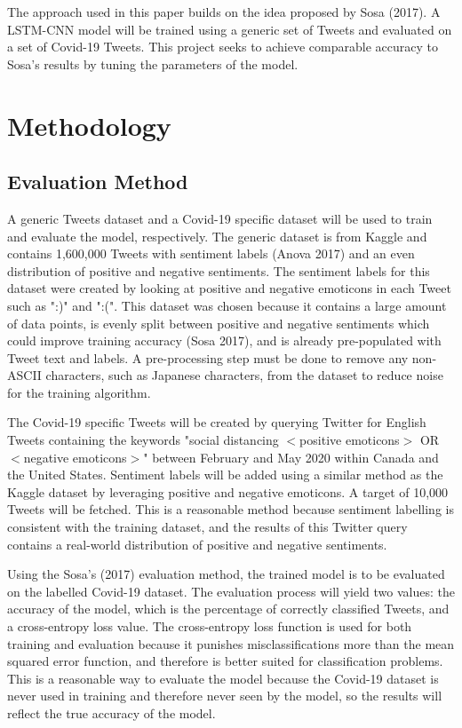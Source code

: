 \documentclass[letterpaper]{article} %
\begin{document}
The approach used in this paper builds on the idea proposed by Sosa (2017). A LSTM-CNN model will be trained using a generic set of Tweets and evaluated on a set of Covid-19 Tweets. This project seeks to achieve comparable accuracy to Sosa's results by tuning the parameters of the model.



\section{Methodology}
\subsection{Evaluation Method}

A generic Tweets dataset and a Covid-19 specific dataset will be used to train and evaluate the model, respectively. The generic dataset is from Kaggle and contains 1,600,000 Tweets with sentiment labels (Anova 2017) and an even distribution of positive and negative sentiments. The sentiment labels for this dataset were created by looking at positive and negative emoticons in each Tweet such as ":)" and ":(". This dataset was chosen because it contains a large amount of data points, is evenly split between positive and negative sentiments which could improve training accuracy (Sosa 2017), and is already pre-populated with Tweet text and labels. A pre-processing step must be done to remove any non-ASCII characters, such as Japanese characters, from the dataset to reduce noise for the training algorithm. 

The Covid-19 specific Tweets will be created by querying Twitter for English Tweets containing the keywords "social distancing $<$positive emoticons$>$ OR $<$negative emoticons$>$" between February and May 2020 within Canada and the United States. Sentiment labels will be added using a similar method as the Kaggle dataset by leveraging positive and negative emoticons. A target of 10,000 Tweets will be fetched. This is a reasonable method because sentiment labelling is consistent with the training dataset, and the results of this Twitter query contains a real-world distribution of positive and negative sentiments.

Using the Sosa's (2017) evaluation method, the trained model is to be evaluated on the labelled Covid-19 dataset. The evaluation process will yield two values: the accuracy of the model, which is the percentage of correctly classified Tweets, and a cross-entropy loss value. The cross-entropy loss function is used for both training and evaluation because it punishes misclassifications more than the mean squared error function, and therefore is better suited for classification problems. This is a reasonable way to evaluate the model because the Covid-19 dataset is never used in training and therefore never seen by the model, so the results will reflect the true accuracy of the model.
\end{document}
